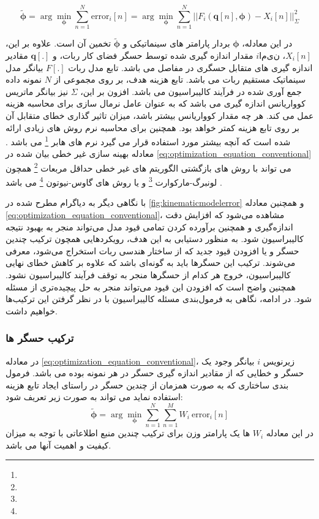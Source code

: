 \begin{equation}\label{eq:optimization_equation_conventional}
	\tilde{\boldsymbol{\phi}} =  \arg\min_{\boldsymbol{\phi}} \sum_{n = 1 }^{N} \text{error}_i[n] = \arg\min_{\boldsymbol{\phi}} \sum_{n = 1}^{N} ||F_i(\boldsymbol{q}[n], \boldsymbol{\phi}) - X_i[n]||^2_{\Sigma}
\end{equation}

در این معادله، $\boldsymbol{\phi}$ بردار پارامتر های سینماتیکی و $\tilde{\boldsymbol{\phi}}$ تخمین آن است. علاوه بر این، $X_i[n]$، 
$iامین$
مقدار اندازه گیری شده توسط حسگر فضای کار ربات، و $\boldsymbol{q}[.]$ مقادیر اندازه گیری های متقابل حسگری در مفاصل می باشد. تابع مدل ربات $F[.]$ بیانگر مدل سینماتیک مستقیم ربات می باشد. تابع هزینه هدف، بر روی مجموعی از $N$ نمونه داده جمع آوری شده در فرآیند کالیبراسیون می باشد. افزون بر این، $\Sigma$ نیز بیانگر ماتریس کوواریانس اندازه گیری می باشد که به عنوان عامل نرمال سازی برای محاسبه هزینه عمل می کند. هر چه مقدار کوواریانس بیشتر باشد، میزان تاثیر گذاری خطای متقابل آن بر روی تابع هزینه کمتر خواهد بود. همچنین برای محاسبه نرم روش های زیادی ارائه شده است که آنچه بیشتر مورد استفاده قرار می گیرد نرم های هابر 
\footnote{}
می باشد
\cite{chang2015huber}.
معادله بهینه سازی غیر خطی بیان شده در 
\ref{eq:optimization_equation_conventional}
می تواند با روش های بازگشتی الگوریتم های غیر خطی حداقل مربعات
\footnote{}
همچون  لونبرگ-مارکوارت
\footnote{}
و یا روش های گاوس-نیوتون
\footnote{}
می باشد
\cite{dellart_robot_perception}.

با نگاهی دیگر به دیاگرام مطرح شده در 
\ref{fig:kinematicmodelerror}
و همچنین معادله 
\ref{eq:optimization_equation_conventional}،
مشاهده می‌شود که افزایش دقت اندازه‌گیری و همچنین برآورده کردن تمامی قیود مدل می‌تواند منجر به بهبود نتیجه کالیبراسیون شود. به منظور دستیابی به این هدف، رویکردهایی همچون ترکیب چندین حسگر و یا افزودن قیود جدید که از ساختار هندسی ربات استخراج می‌شود، معرفی می‌شوند. ترکیب این حسگرها باید به گونه‌ای باشد که علاوه بر کاهش خطای نهایی کالیبراسیون، خروج هر کدام از حسگرها منجر به توقف فرآیند کالیبراسیون نشود. همچنین واضح است که افزودن این قیود می‌تواند منجر به حل پیچیده‌تری از مسئله شود. در ادامه، نگاهی به فرمول‌بندی مسئله کالیبراسیون با در نظر گرفتن این ترکیب‌ها خواهیم داشت.

\subsubsection{ترکیب حسگر ها}
در معادله 
\ref{eq:optimization_equation_conventional}،
زیرنویس 
$i$
بیانگر وجود یک حسگر و خطایی که از مقادیر اندازه گیری حسگر در هر نمونه بوده می باشد. فرمول بندی ساختاری که به صورت همزمان از چندین حسگر در راستای ایجاد تابع هزینه استفاده نماید می تواند به صورت زیر تعریف شود:
\begin{equation}\label{eq:optimization_equation_conventional_multi_sensor}
	\tilde{\boldsymbol{\phi}} =  \arg\min_{\boldsymbol{\phi}} \sum_{n = 1 }^{N} \sum_{n = 1 }^{M} W_i~\text{error}_i[n] 
\end{equation}
در این معادله 
$W_i$
ها یک پارامتر وزن برای ترکیب چندین منبع اطلاعاتی با توجه به میزان کیفیت و اهمیت آنها می باشد.


